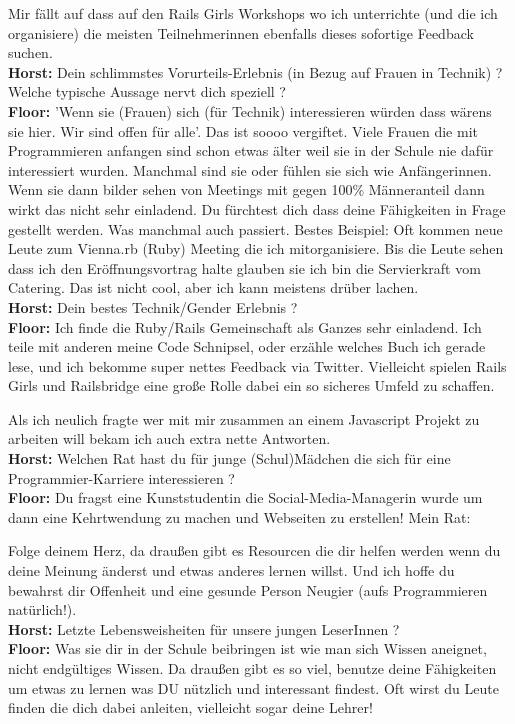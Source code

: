 \documentclass[10pt,a4paper,ngerman,twoside]{article} %
\begin{document}
\begin{multicols}{3}
Mir fällt auf dass auf den Rails Girls Workshops wo ich unterrichte (und die ich organisiere) die meisten Teilnehmerinnen ebenfalls dieses sofortige Feedback suchen. \\
\textbf{Horst:} Dein schlimmstes Vorurteils-Erlebnis (in Bezug auf Frauen in Technik) ? Welche typische Aussage nervt dich speziell ? \\
\textbf{Floor:} 'Wenn sie (Frauen) sich (für Technik) interessieren würden dass wärens sie hier. Wir sind offen für alle'. Das ist soooo vergiftet. Viele Frauen die mit Programmieren anfangen sind schon etwas älter weil sie in der Schule nie dafür interessiert wurden. Manchmal sind sie oder fühlen sie sich wie Anfängerinnen. Wenn sie dann bilder sehen von Meetings mit gegen 100\% Männeranteil dann wirkt das nicht sehr einladend. Du fürchtest dich dass deine Fähigkeiten in Frage gestellt werden. Was manchmal auch passiert. Bestes Beispiel: Oft kommen neue Leute zum Vienna.rb (Ruby) Meeting die ich mitorganisiere. Bis die Leute sehen dass ich den Eröffnungsvortrag halte glauben sie ich bin die Servierkraft vom Catering. Das ist nicht cool, aber ich kann meistens drüber lachen. \\
\textbf{Horst:}  Dein bestes Technik/Gender Erlebnis ? \\
\textbf{Floor:} Ich finde die Ruby/Rails Gemeinschaft als Ganzes sehr einladend. Ich teile mit anderen meine Code Schnipsel, oder erzähle welches Buch ich gerade lese, und ich bekomme super nettes Feedback via Twitter. Vielleicht spielen Rails Girls und Railsbridge eine große Rolle dabei ein so sicheres Umfeld zu schaffen.

Als ich neulich fragte wer mit mir zusammen an einem Javascript Projekt zu arbeiten will bekam ich auch extra nette Antworten. \\
\textbf{Horst:} Welchen Rat hast du für junge (Schul)Mädchen die sich für eine Programmier-Karriere interessieren ? \\
\textbf{Floor:} Du fragst eine Kunststudentin die Social-Media-Managerin wurde um dann eine Kehrtwendung zu machen und Webseiten zu erstellen! Mein Rat: 

Folge deinem Herz, da draußen gibt es Resourcen die dir helfen werden wenn du deine Meinung änderst und etwas anderes lernen willst. Und ich hoffe du bewahrst dir Offenheit und eine gesunde Person Neugier (aufs Programmieren natürlich!). \\
\textbf{Horst:} Letzte Lebensweisheiten für unsere jungen LeserInnen ? \\
\textbf{Floor:} Was sie dir in der Schule beibringen ist wie man sich Wissen aneignet, nicht endgültiges Wissen. Da draußen gibt es so viel, benutze deine Fähigkeiten um etwas zu lernen was DU nützlich und interessant findest. Oft wirst du Leute finden die dich dabei anleiten, vielleicht sogar deine Lehrer!


\end{multicols}
\end{document}
